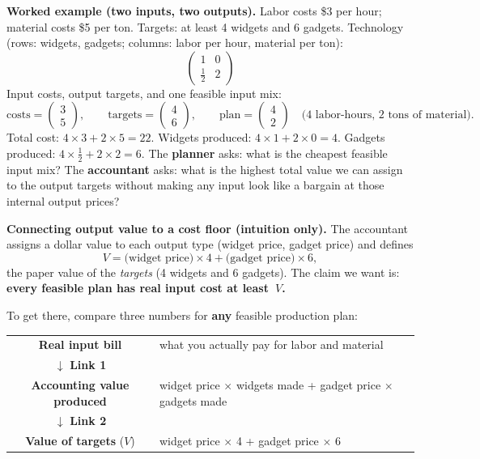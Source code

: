 \documentclass[11pt,a4paper]{article}
\begin{document}
\textbf{Worked example (two inputs, two outputs).}
Labor costs \$3 per hour; material costs \$5 per ton.
Targets: at least 4 widgets and 6 gadgets.
Technology (rows: widgets, gadgets; columns: labor per hour, material per ton):
\[
  \begin{pmatrix}
    1 & 0 \\[4pt]
    \tfrac12 & 2
  \end{pmatrix}
\]
Input costs, output targets, and one feasible input mix:
\[
  \text{costs}=
  \begin{pmatrix} 3 \\ 5 \end{pmatrix},
  \qquad
  \text{targets}=
  \begin{pmatrix} 4 \\ 6 \end{pmatrix},
  \qquad
  \text{plan}=
  \begin{pmatrix} 4 \\ 2 \end{pmatrix}
  \quad
  \text{(4 labor-hours, 2 tons of material).}
\]
Total cost: $4\times 3 + 2\times 5 = 22$.
Widgets produced: $4\times 1 + 2\times 0 = 4$.
Gadgets produced: $4\times\tfrac12 + 2\times 2 = 6$.
The \textbf{planner} asks: what is the cheapest feasible input mix?
The \textbf{accountant} asks: what is the highest total value we can assign to the output targets without
making any input look like a bargain at those internal output prices?

\textbf{Connecting output value to a cost floor (intuition only).}
The accountant assigns a dollar value to each output type (widget price, gadget price) and defines
\[
  V = \text{(widget price)}\times 4 + \text{(gadget price)}\times 6,
\]
the paper value of the \emph{targets} (4 widgets and 6 gadgets).
The claim we want is: \textbf{every feasible plan has real input cost at least~$V$.}

To get there, compare three numbers for \textbf{any} feasible production plan:

\begin{center}
\small
\begin{tabular}{cl}
\textbf{Real input bill} & what you actually pay for labor and material \\[2pt]
$\downarrow$ \textbf{Link 1} & \\[2pt]
\textbf{Accounting value produced} & widget price $\times$ widgets made + gadget price $\times$ gadgets made \\[2pt]
$\downarrow$ \textbf{Link 2} & \\[2pt]
\textbf{Value of targets} ($V$) & widget price $\times$ 4 + gadget price $\times$ 6 \\
\end{tabular}
\end{center}
\end{document}
